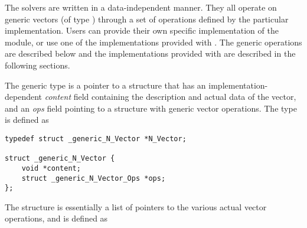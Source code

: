 %
The {\sundials} solvers are written in a data-independent manner.
They all operate on generic vectors (of type ) through a set of
operations defined by the particular {\nvector} implementation.
Users can provide their own specific implementation of the {\nvector}
module, or use one of the implementations provided with {\sundials}.
The generic operations are described below and the implementations
provided with {\sundials} are described in the following sections.

The generic  type is a pointer to a structure that has an
implementation-dependent {\em content} field containing the
description and actual data of the vector, and an {\em ops} field
pointing to a structure with generic vector operations.
The type  is defined as
\begin{verbatim}
typedef struct _generic_N_Vector *N_Vector;

struct _generic_N_Vector {
    void *content;
    struct _generic_N_Vector_Ops *ops;
};
\end{verbatim}
The  structure is essentially a list of pointers to
the various actual vector operations, and is defined as
